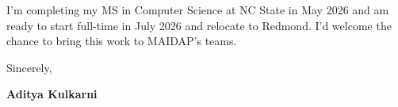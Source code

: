 \documentclass[11pt]{article}
\begin{document}
\vspace{8pt}
I'm completing my MS in Computer Science at NC State in May 2026 and am ready to start full-time in July 2026 and relocate to Redmond. I'd welcome the chance to bring this work to MAIDAP's teams.

\vspace{10pt}
Sincerely,

\vspace{4pt}
\textbf{Aditya Kulkarni}
\end{document}
